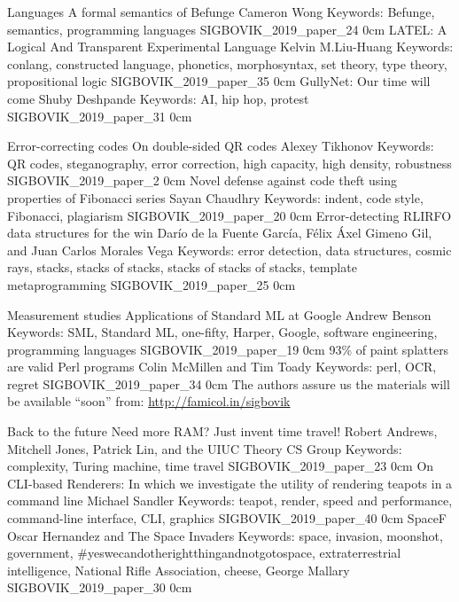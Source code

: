 \addtrack
	{}{Languages}
\addpaper
	{A formal semantics of Befunge}
	{Cameron Wong}
	{Keywords: Befunge, semantics, programming languages}
	{SIGBOVIK_2019_paper_24}
	{0cm}
	{}
\addpaper
	{LATEL: A Logical And Transparent Experimental Language}
	{Kelvin M.\@ Liu-Huang}
	{Keywords: conlang, constructed language, phonetics, morphosyntax, set theory, type theory, propositional logic}
	{SIGBOVIK_2019_paper_35}
	{0cm}
	{}
\addpaper
	{GullyNet: Our time will come}
	{Shuby Deshpande}
	{Keywords: AI, hip hop, protest}
	{SIGBOVIK_2019_paper_31}
	{0cm}
	{}

\addtrack
	{}{Error-correcting codes}
\addpaper
	{On double-sided QR codes}
	{Alexey Tikhonov}
	{Keywords: QR codes, steganography, error correction, high capacity, high density, robustness}
	{SIGBOVIK_2019_paper_2}
	{0cm}
	{}
\addpaper
	{Novel defense against code theft using properties of Fibonacci series}
	{Sayan Chaudhry}
	{Keywords: indent, code style, Fibonacci, plagiarism}
	{SIGBOVIK_2019_paper_20}
	{0cm}
	{}
\addpaper
	{Error-detecting RLIRFO data structures for the win}
	{Darío de la Fuente García, Félix Áxel Gimeno Gil, and Juan Carlos Morales Vega}
	{Keywords: error detection, data structures, cosmic rays, stacks, stacks of stacks, stacks of stacks of stacks, template metaprogramming}
	{SIGBOVIK_2019_paper_25}
	{0cm}
	{}

\addtrack
	{}{Measurement studies}
\addpaper
	{Applications of Standard ML at Google}
	{Andrew Benson}
	{Keywords: SML, Standard ML, one-fifty, Harper, Google, software engineering, programming languages}
	{SIGBOVIK_2019_paper_19}
	{0cm}
	{}
\addpaper
	{93\% of paint splatters are valid Perl programs}
	{Colin McMillen and Tim Toady}
	{Keywords: perl, OCR, regret}
	{SIGBOVIK_2019_paper_34}
	{0cm}
	{\vspace{0.15in} {\scriptsize The authors assure us the materials will be available ``soon'' from: \url{http://famicol.in/sigbovik}} }

\addtrack
	{}{Back to the future}
\addpaper
	{Need more RAM? Just invent time travel!}
	{Robert Andrews, Mitchell Jones, Patrick Lin, and the UIUC Theory CS Group}
	{Keywords: complexity, Turing machine, time travel}
	{SIGBOVIK_2019_paper_23}
	{0cm}
	{}
\addpaper
	{On CLI-based Renderers: In which we investigate the utility of rendering teapots in a command line}
	{Michael Sandler}
	{Keywords: teapot, render, speed and performance, command-line interface, CLI, graphics}
	{SIGBOVIK_2019_paper_40}
	{0cm}
	{}
\addpaper
	{SpaceF}
	{Oscar Hernandez and The Space Invaders}
	{Keywords: space, invasion, moonshot, government, \#yeswecandotherightthingandnotgotospace, extraterrestrial intelligence, National Rifle Association, cheese, George Mallary}
	{SIGBOVIK_2019_paper_30}
	{0cm}
	{}

